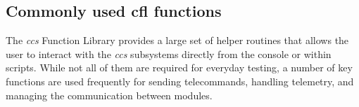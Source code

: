 \subsection{Commonly used cfl functions} \label{functions}
The \textit{ccs} Function Library provides a large set of helper routines that allows the user to interact with the \textit{ccs} subsystems directly from the console or within scripts.
While not all of them are required for everyday testing, a number of key functions are used frequently for sending telecommands, handling telemetry, and managing the communication between modules.\\



